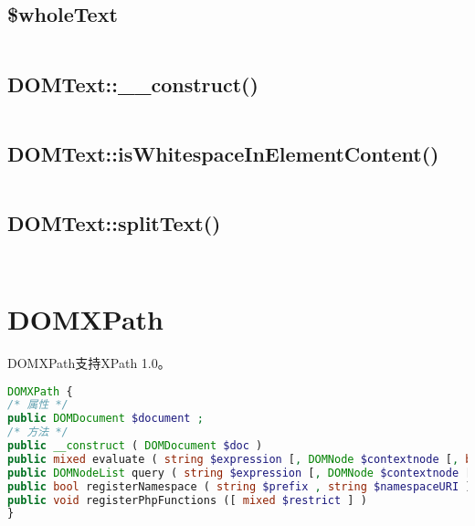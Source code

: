 \subsection{\$wholeText}

\begin{lstlisting}[language=PHP]

\end{lstlisting}

\subsection{DOMText::\_\_construct()}


\begin{lstlisting}[language=PHP]

\end{lstlisting}

\subsection{DOMText::isWhitespaceInElementContent()}


\begin{lstlisting}[language=PHP]

\end{lstlisting}

\subsection{DOMText::splitText()}


\begin{lstlisting}[language=PHP]

\end{lstlisting}


\begin{lstlisting}[language=PHP]

\end{lstlisting}
\section{DOMXPath}

DOMXPath支持XPath 1.0。


\begin{lstlisting}[language=PHP]
DOMXPath {
/* 属性 */
public DOMDocument $document ;
/* 方法 */
public __construct ( DOMDocument $doc )
public mixed evaluate ( string $expression [, DOMNode $contextnode [, bool $registerNodeNS = true ]] )
public DOMNodeList query ( string $expression [, DOMNode $contextnode [, bool $registerNodeNS = true ]] )
public bool registerNamespace ( string $prefix , string $namespaceURI )
public void registerPhpFunctions ([ mixed $restrict ] )
}
\end{lstlisting}


